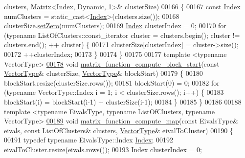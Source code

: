 \begin{DoxyCode}
      clusters, \hyperlink{group___core___module_class_eigen_1_1_matrix}{Matrix<Index, Dynamic, 1>}& clusterSize)
00166 \{
00167   \textcolor{keyword}{const} \hyperlink{namespace_eigen_a62e77e0933482dafde8fe197d9a2cfde}{Index} numClusters = \textcolor{keyword}{static\_cast<}\hyperlink{namespace_eigen_a62e77e0933482dafde8fe197d9a2cfde}{Index}\textcolor{keyword}{>}(clusters.size());
00168   clusterSize.\hyperlink{class_eigen_1_1_plain_object_base_ac21ad5f989f320e46958b75ac8d9a1da}{setZero}(numClusters);
00169   \hyperlink{namespace_eigen_a62e77e0933482dafde8fe197d9a2cfde}{Index} clusterIndex = 0;
00170   \textcolor{keywordflow}{for} (\textcolor{keyword}{typename} ListOfClusters::const\_iterator cluster = clusters.begin(); cluster != clusters.end(); ++
      cluster) \{
00171     clusterSize[clusterIndex] = cluster->size();
00172     ++clusterIndex;
00173   \}
00174 \}
00175 
00177 \textcolor{keyword}{template} <\textcolor{keyword}{typename} VectorType>
\hyperlink{namespace_eigen_1_1internal_a2144f635d30028a25e7eb3510c315ad3}{00178} \textcolor{keywordtype}{void} \hyperlink{namespace_eigen_1_1internal_a2144f635d30028a25e7eb3510c315ad3}{matrix\_function\_compute\_block\_start}(\textcolor{keyword}{const} 
      \hyperlink{struct_vector_type}{VectorType}& clusterSize, \hyperlink{struct_vector_type}{VectorType}& blockStart)
00179 \{
00180   blockStart.resize(clusterSize.rows());
00181   blockStart(0) = 0;
00182   \textcolor{keywordflow}{for} (\textcolor{keyword}{typename} VectorType::Index i = 1; i < clusterSize.rows(); i++) \{
00183     blockStart(i) = blockStart(i-1) + clusterSize(i-1);
00184   \}
00185 \}
00186 
00188 \textcolor{keyword}{template} <\textcolor{keyword}{typename} EivalsType, \textcolor{keyword}{typename} ListOfClusters, \textcolor{keyword}{typename} VectorType>
\hyperlink{namespace_eigen_1_1internal_ade67364a006320cd7103f0f3366def09}{00189} \textcolor{keywordtype}{void} \hyperlink{namespace_eigen_1_1internal_ade67364a006320cd7103f0f3366def09}{matrix\_function\_compute\_map}(\textcolor{keyword}{const} EivalsType& eivals, \textcolor{keyword}{const} ListOfClusters&
       clusters, \hyperlink{struct_vector_type}{VectorType}& eivalToCluster)
00190 \{
00191   \textcolor{keyword}{typedef} \textcolor{keyword}{typename} EivalsType::Index \hyperlink{namespace_eigen_a62e77e0933482dafde8fe197d9a2cfde}{Index};
00192   eivalToCluster.resize(eivals.rows());
00193   Index clusterIndex = 0;

\end{DoxyCode}
